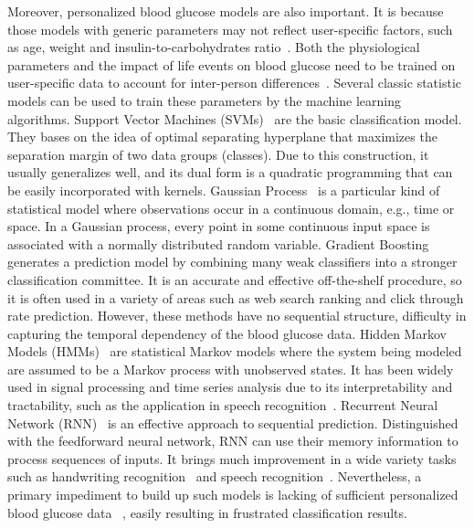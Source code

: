 Moreover, personalized blood glucose models are also important. It is because those models with generic parameters may not reflect user-specific factors, such as age, weight and insulin-to-carbohydrates ratio~\cite{bib:IJNMBE16:Oviedo}. 
Both the physiological parameters and the impact of life events on blood glucose need to be trained on user-specific data to account for inter-person differences~\cite{bib:ICMLA13:Bunescu}.  Several classic statistic models can be used to train these parameters by the machine learning algorithms.
\textcolor[rgb]{1.00,0.00,0.00}{Support Vector Machines (SVMs)~\cite{bib:wang2005support} are the basic classification model.  They bases on the idea of optimal separating hyperplane that maximizes the separation margin of two data groups (classes). Due to this construction, it usually generalizes well, and its dual form is a quadratic programming that can be easily incorporated with kernels.
Gaussian Process~\cite{bib:rasmussen2006gaussian} is a particular kind of statistical model where observations occur in a continuous domain, e.g., time or space. In a Gaussian process, every point in some continuous input space is associated with a normally distributed random variable.
Gradient Boosting~\cite{bib:friedman2002stochastic} generates a prediction model by combining many weak classifiers into a stronger classification committee.
It is an accurate and effective off-the-shelf procedure, so it is often used in a variety of areas such as web search ranking and click through rate prediction. However, these methods have no sequential structure, difficulty in capturing the temporal dependency of the blood glucose data.
Hidden Markov Models (HMMs)~\cite{bib:rabiner1986introduction} are statistical Markov models where the system being modeled are assumed to be a Markov process with unobserved states. It has been widely used in signal processing and time series analysis due to its interpretability and tractability, such as the application in speech recognition~\cite{bib:gales2008application}.
Recurrent Neural Network (RNN)~\cite{bib:pearlmutter1989learning} is an effective approach to sequential prediction. Distinguished with the feedforward neural network, RNN can use their memory information to process sequences of inputs. It brings much improvement in a wide variety tasks such as handwriting recognition~\cite{bib:graves2008unconstrained} and speech recognition~\cite{bib:graves2013speech}.}
Nevertheless, a primary impediment to build up such models is lacking of sufficient personalized blood glucose data ~\cite{bib:KDHealth16:Marling}, easily resulting in frustrated classification results.

